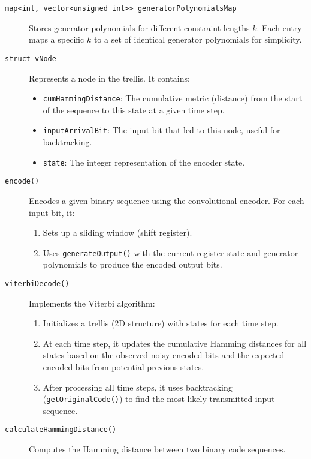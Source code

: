 \documentclass[12pt,a4paper]{article}
\begin{document}
\begin{description}
    \item[\texttt{map<int, vector<unsigned int>> generatorPolynomialsMap}] 
    Stores generator polynomials for different constraint lengths $k$. Each entry maps a specific $k$ to a set of identical generator polynomials for simplicity.

    \item[\texttt{struct vNode}]
    Represents a node in the trellis. It contains:
    \begin{itemize}
        \item \texttt{cumHammingDistance}: The cumulative metric (distance) from the start of the sequence to this state at a given time step.
        \item \texttt{inputArrivalBit}: The input bit that led to this node, useful for backtracking.
        \item \texttt{state}: The integer representation of the encoder state.
    \end{itemize}

    \item[\texttt{encode()}]
    Encodes a given binary sequence using the convolutional encoder. For each input bit, it:
    \begin{enumerate}
        \item Sets up a sliding window (shift register).
        \item Uses \texttt{generateOutput()} with the current register state and generator polynomials to produce the encoded output bits.
    \end{enumerate}

    \item[\texttt{viterbiDecode()}]
    Implements the Viterbi algorithm:
    \begin{enumerate}
        \item Initializes a trellis (2D structure) with states for each time step.
        \item At each time step, it updates the cumulative Hamming distances for all states based on the observed noisy encoded bits and the expected encoded bits from potential previous states.
        \item After processing all time steps, it uses backtracking (\texttt{getOriginalCode()}) to find the most likely transmitted input sequence.
    \end{enumerate}

    \item[\texttt{calculateHammingDistance()}]
    Computes the Hamming distance between two binary code sequences.


\end{description}
\end{document}
